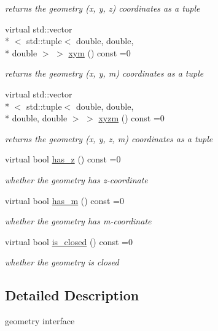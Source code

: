 \begin{DoxyCompactItemize}
\begin{DoxyCompactList}\small\item\em returns the geometry (x, y, z) coordinates as a tuple \end{DoxyCompactList}\item 
virtual std\-::vector\\*
$<$ std\-::tuple$<$ double, double, \\*
double $>$ $>$ \hyperlink{classsimo_1_1shapes_1_1_geometry_aa74d24c520c7760619e17fdfd7c2eff0}{xym} () const =0
\begin{DoxyCompactList}\small\item\em returns the geometry (x, y, m) coordinates as a tuple \end{DoxyCompactList}\item 
virtual std\-::vector\\*
$<$ std\-::tuple$<$ double, double, \\*
double, double $>$ $>$ \hyperlink{classsimo_1_1shapes_1_1_geometry_a1dc27d8d1146b3057355f96d7954f979}{xyzm} () const =0
\begin{DoxyCompactList}\small\item\em returns the geometry (x, y, z, m) coordinates as a tuple \end{DoxyCompactList}\item 
virtual bool \hyperlink{classsimo_1_1shapes_1_1_geometry_a7d2d67f5845bcccca7d88619b0be288a}{has\-\_\-z} () const =0
\begin{DoxyCompactList}\small\item\em whether the geometry has z-\/coordinate \end{DoxyCompactList}\item 
virtual bool \hyperlink{classsimo_1_1shapes_1_1_geometry_aa6b0b9e19c782d137effc7be2e5416a1}{has\-\_\-m} () const =0
\begin{DoxyCompactList}\small\item\em whether the geometry has m-\/coordinate \end{DoxyCompactList}\item 
virtual bool \hyperlink{classsimo_1_1shapes_1_1_geometry_a2c1ea77c6f3b7b6c20eb9894be264f80}{is\-\_\-closed} () const =0
\begin{DoxyCompactList}\small\item\em whether the geometry is closed \end{DoxyCompactList}\end{DoxyCompactItemize}


\subsection{Detailed Description}
geometry interface 

